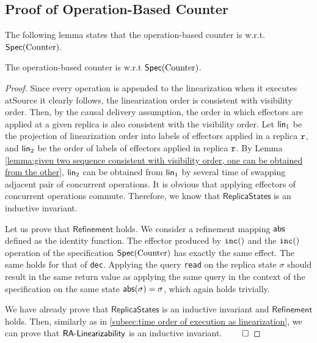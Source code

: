 \subsection{Proof of Operation-Based Counter}
\label{subsec:proof of operation-based counter}

The following lemma states that the operation-based counter is \crdtlinearizable{} w.r.t. $\specCounter$.

\begin{lemma}
\label{lemma:operation-based counter is correct}
The operation-based counter is \crdtlinearizable{} w.r.t $\specCounter$.
\end{lemma}

\begin {proof}
Since every operation is appended to the linearization when it executes atSource it clearly follows, the linearization order is consistent with visibility order. Then, by the causal delivery assumption, the order in which effectors are applied at a given replica is also consistent with the visibility order. Let $\alinord_1$ be the projection of linearization order into labels of effectors applied in a replica $\arep$, and $\alinord_2$ be the order of labels of effectors applied in replica $\arep$. By Lemma \ref{lemma:given two sequence consistent with visibility order, one can be obtained from the other}, $\alinord_2$ can be obtained from $\alinord_1$ by several time of swapping adjacent pair of concurrent operations. It is obvious that applying effectors of concurrent operations commute. Therefore, we know that $\mathsf{ReplicaStates}$ is an inductive invariant.

Let us prove that $\mathsf{Refinement}$ holds. We consider a refinement mapping $\refmap$ defined as the identity function. The effector produced by $\alabelshort[{\tt inc}]{}$ and the $\alabelshort[{\tt inc}]{}$ operation of the specification $\specCounter$ has exactly the same effect. The same holds for that of {\tt dec}. Applying the query {\tt read} on the replica state $\sigma$ should result in the same return value as applying the same query in the context of the specification on the same state $\refmap(\sigma)=\sigma$, which again holds trivially.

We have already prove that $\mathsf{ReplicaStates}$ is an inductive invariant and $\mathsf{Refinement}$ holds. Then, similarly as in \sectionautorefname \ref{subsec:time order of execution as linearization}, we can prove that $\mathsf{\CRDTLinshort{}}$ is an inductive invariant. $\qed$
\end {proof}








